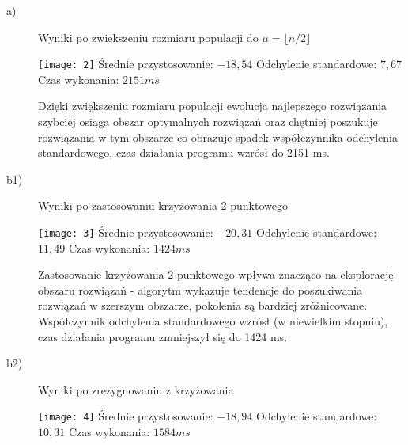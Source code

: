\documentclass[11pt]{article}
\begin{document}
\begin{description}

\item[a)] Wyniki po zwiekszeniu rozmiaru populacji do $ \mu = \lfloor n/2 \rfloor $\newline

\texttt{[image: 2]}\newline
Średnie przystosowanie: $-18,54$\newline
Odchylenie standardowe: $7,67$\newline
Czas wykonania: $2151 ms$\newline

Dzięki zwiększeniu rozmiaru populacji ewolucja najlepszego
rozwiązania szybciej osiąga obszar optymalnych rozwiązań 
oraz chętniej poszukuje rozwiązania w tym obszarze co obrazuje 
spadek współczynnika odchylenia standardowego, czas działania
programu wzrósł do 2151 ms.

\newpage
\item[b1)] Wyniki po zastosowaniu krzyżowania 2-punktowego\newline

\texttt{[image: 3]}\newline
Średnie przystosowanie: $-20,31$\newline
Odchylenie standardowe: $11,49$\newline
Czas wykonania: $1424 ms$

Zastosowanie krzyżowania 2-punktowego wpływa znacząco na eksplorację 
obszaru rozwiązań - algorytm wykazuje tendencje do poszukiwania 
rozwiązań w szerszym obszarze, pokolenia są bardziej zróżnicowane.
Współczynnik odchylenia standardowego wzrósł (w niewielkim stopniu),
czas działania programu zmniejszył się do 1424 ms.

\newpage
\item[b2)] Wyniki po zrezygnowaniu z krzyżowania\newline

\texttt{[image: 4]}\newline
Średnie przystosowanie: $-18,94$\newline
Odchylenie standardowe: $10,31$\newline
Czas wykonania: $1584 ms$


\end{description}
\end{document}
